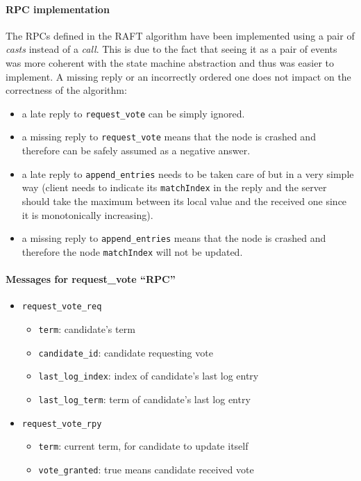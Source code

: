 \documentclass[a4paper]{article}
\begin{document}
\paragraph{RPC implementation}
The RPCs defined in the RAFT algorithm have been implemented using 
a pair of \emph{casts} instead of a \emph{call}. This is due to the fact that
seeing it as a pair of events was more coherent with the state machine 
abstraction and thus was easier to implement. A missing reply or an incorrectly
ordered one does not impact on the correctness of the algorithm:
\begin{itemize}
    \item a late reply to \texttt{request\_vote} can be simply ignored.
    \item a missing reply to \texttt{request\_vote} means that the node is 
        crashed and therefore can be safely assumed as a negative answer.
    \item a late reply to \texttt{append\_entries} needs to be taken care of
        but in a very simple way (client needs to indicate its 
        \texttt{matchIndex} in the reply and the server should take the maximum
        between its local value and the received one since it is monotonically
        increasing).
    \item a missing reply to \texttt{append\_entries} means that the node is 
        crashed and therefore the node \texttt{matchIndex} will not be updated.
\end{itemize}

\paragraph{Messages for request\_vote ``RPC''}
\begin{itemize}
    \item \texttt{request\_vote\_req}
    \begin{itemize}
        \item \texttt{term}: candidate's term
        \item \texttt{candidate\_id}: candidate requesting vote
        \item \texttt{last\_log\_index}: index of candidate's last log entry
        \item \texttt{last\_log\_term}: term of candidate's last log entry
    \end{itemize}
    \item \texttt{request\_vote\_rpy}
    \begin{itemize}
        \item \texttt{term}: current term, for candidate to update itself
        \item \texttt{vote\_granted}: true means candidate received vote
    \end{itemize}
\end{itemize}
\end{document}
